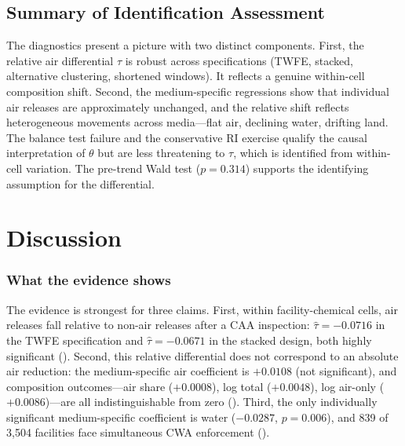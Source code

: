 \documentclass[12pt]{article}
\begin{document}
\subsection{Summary of Identification Assessment}

The diagnostics present a picture with two distinct components. First, the relative air differential $\tau$ is robust across specifications (TWFE, stacked, alternative clustering, shortened windows). It reflects a genuine within-cell composition shift. Second, the medium-specific regressions show that individual air releases are approximately unchanged, and the relative shift reflects heterogeneous movements across media---flat air, declining water, drifting land. The balance test failure and the conservative RI exercise qualify the causal interpretation of $\theta$ but are less threatening to $\tau$, which is identified from within-cell variation. The pre-trend Wald test ($p = 0.314$) supports the identifying assumption for the differential.


\section{Discussion}
\label{sec:discussion}

\subsubsection*{What the evidence shows} The evidence is strongest for three claims. First, within facility-chemical cells, air releases fall relative to non-air releases after a CAA inspection: $\hat{\tau} = -0.0716$ in the TWFE specification and $\hat{\tau} = -0.0671$ in the stacked design, both highly significant (). Second, this relative differential does not correspond to an absolute air reduction: the medium-specific air coefficient is $+0.0108$ (not significant), and composition outcomes---air share ($+0.0008$), log total ($+0.0048$), log air-only ($+0.0086$)---are all indistinguishable from zero (). Third, the only individually significant medium-specific coefficient is water ($-0.0287$, $p = 0.006$), and 839 of 3,504 facilities face simultaneous CWA enforcement ().
\end{document}
